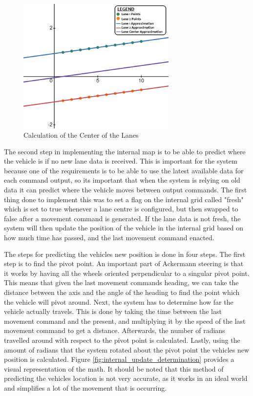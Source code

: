 \documentclass[titlepage,draft]{article}
\begin{document}
{\begin{figure}
	\centering
	\includegraphics[width=0.7\textwidth]{lane_center}
	\caption{Calculation of the Center of the Lanes}
	\label{fig:lane_center_determination}
\end{figure}

The second step in implementing the internal map is to be able to predict where the vehicle is if no new lane data is received. This is important for the system because one of the requirements is to be able to use the latest available data for each command output, so its important that when the system is relying on old data it can predict where the vehicle moves between output commands. The first thing done to implement this was to set a flag on the internal grid called "fresh" which is set to true whenever a lane centre is configured, but then swapped to false after a movement command is generated. If the lane data is not fresh, the system will then update the position of the vehicle in the internal grid based on how much time has passed, and the last movement command enacted.

The steps for predicting the vehicles new position is done in four steps. The first step is to find the pivot point. An important part of Ackermann steering is that it works by having all the wheels oriented perpendicular to a singular pivot point. This means that given the last movement commands heading, we can take the distance between the axis and the angle of the heading to find the point which the vehicle will pivot around. Next, the system has to determine how far the vehicle actually travels. This is done by taking the time between the last movement command and the present, and multiplying it by the speed of the last movement command to get a distance. Afterwards, the number of radians travelled around with respect to the pivot point is calculated. Lastly, using the amount of radians that the system rotated about the pivot point the vehicles new position is calculated. Figure \ref{fig:internal_update_determination} provides a visual representation of the math. It should be noted that this method of predicting the vehicles location is not very accurate, as it works in an ideal world and simplifies a lot of the movement that is occurring.

}
\end{document}
